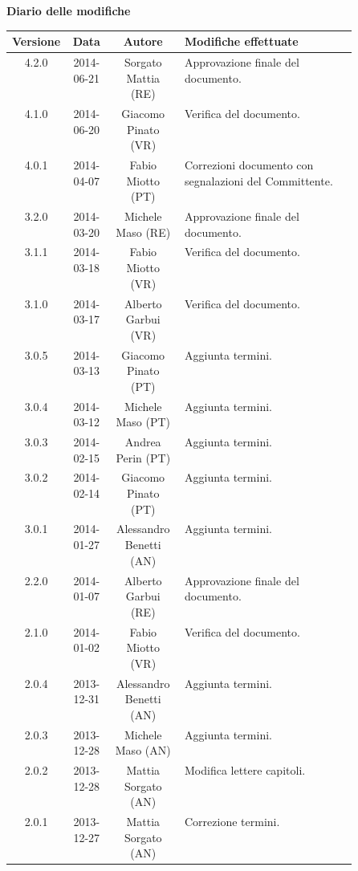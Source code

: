 \begin{abstract}
\begin{center}
Questo documento si prefigge di chiarire le possibili ambiguità tra i vari termini utilizzati all'interno dei documenti redatti dal gruppo \NomeGruppo{}
\end{center}
\end{abstract}

\newpage
\textbf{Diario delle modifiche}
\begin{center}
\begin{longtable}{|c|c|c|p{0.5\linewidth}|}
\toprule
\textbf{Versione} & \textbf{Data} & \textbf{Autore} & \textbf{Modifiche effettuate}\\

\midrule
4.2.0 & 2014-06-21 &  Sorgato Mattia (RE) & Approvazione finale del documento.\\
\midrule
4.1.0 & 2014-06-20 &  Giacomo Pinato (VR) & Verifica del documento. \\

\midrule
4.0.1 & 2014-04-07 & Fabio Miotto (PT) & Correzioni documento con segnalazioni del Committente.\\

\midrule
3.2.0 & 2014-03-20 & Michele Maso (RE) & Approvazione finale del documento.\\
\midrule
3.1.1 & 2014-03-18 & Fabio Miotto (VR) & Verifica del documento. \\
\midrule
3.1.0 & 2014-03-17 & Alberto Garbui (VR) & Verifica del documento. \\
\midrule
3.0.5 & 2014-03-13 & Giacomo Pinato (PT) & Aggiunta termini.\\
\midrule
3.0.4 & 2014-03-12 & Michele Maso (PT) & Aggiunta termini.\\
\midrule
3.0.3 & 2014-02-15 & Andrea Perin (PT) & Aggiunta termini.\\
\midrule
3.0.2 & 2014-02-14 & Giacomo Pinato (PT) & Aggiunta termini.\\
\midrule
3.0.1 & 2014-01-27 & Alessandro Benetti (AN) & Aggiunta termini.\\

\midrule
2.2.0 & 2014-01-07 & Alberto Garbui (RE) & Approvazione finale del documento.\\
\midrule
2.1.0 & 2014-01-02 & Fabio Miotto (VR) & Verifica del documento.\\
\midrule
2.0.4 & 2013-12-31 & Alessandro Benetti (AN) & Aggiunta termini.\\
\midrule
2.0.3 & 2013-12-28 & Michele Maso (AN) & Aggiunta termini.\\
\midrule
2.0.2 & 2013-12-28 & Mattia Sorgato (AN) & Modifica lettere capitoli.\\
\midrule
2.0.1 & 2013-12-27 & Mattia Sorgato (AN) & Correzione termini.\\


\end{longtable}
\end{center}
